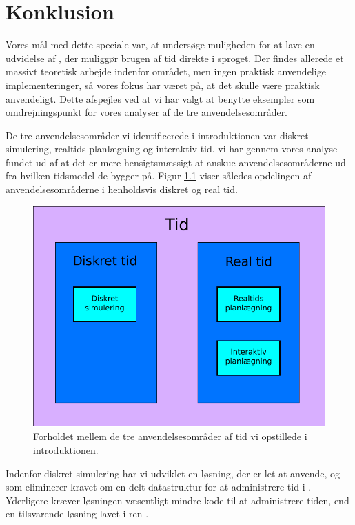 \chapter{Konklusion} 
\label{chap:konklusion}

Vores mål med dette speciale var, at undersøge muligheden for at lave en udvidelse af \pycsp, der muliggør brugen af tid direkte i sproget. Der findes allerede et massivt teoretisk arbejde indenfor området, men ingen praktisk anvendelige implementeringer, så vores fokus har været på, at det skulle være praktisk anvendeligt. Dette afspejles ved at vi har valgt at benytte eksempler som omdrejningspunkt for vores analyser af de tre anvendelsesområder. 

De tre anvendelsesområder vi identificerede i introduktionen var diskret simulering, realtids-planlægning og interaktiv tid. vi har gennem vores analyse fundet ud af at det er mere hensigtsmæssigt at anskue anvendelsesområderne ud fra hvilken tidsmodel de bygger på. Figur \ref{fig:timemodel} viser således opdelingen af anvendelsesområderne i henholdsvis diskret og real tid.  

\begin{figure}[htp]
 \begin{center}
  \includegraphics[scale=0.6]{images/timemodel}
	\caption{Forholdet mellem de tre anvendelsesområder af tid vi opstillede i introduktionen.}
	\label{fig:timemodel}
\end{center}
\end{figure}

Indenfor diskret simulering har vi udviklet en løsning, der er let at anvende, og som eliminerer kravet om en delt datastruktur for at administrere tid i \pycsp. Yderligere kræver løsningen væsentligt mindre kode til at administrere tiden, end en tilsvarende løsning lavet i ren \pycsp. 

